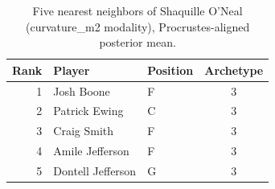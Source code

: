 \begin{table}[htbp]
  \centering\small
  \begin{tabular}{rllc}
    \toprule
    Rank & Player & Position & Archetype \\
    \midrule
    1 & Josh Boone & F & 3 \\
    2 & Patrick Ewing & C & 3 \\
    3 & Craig Smith & F & 3 \\
    4 & Amile Jefferson & F & 3 \\
    5 & Dontell Jefferson & G & 3 \\
    \bottomrule
  \end{tabular}
  \caption{Five nearest neighbors of Shaquille O'Neal (curvature_m2 modality), Procrustes-aligned posterior mean.}
  \label{tab:Shaquille_O_Neal_neighbors_curvature_m2}
\end{table}

